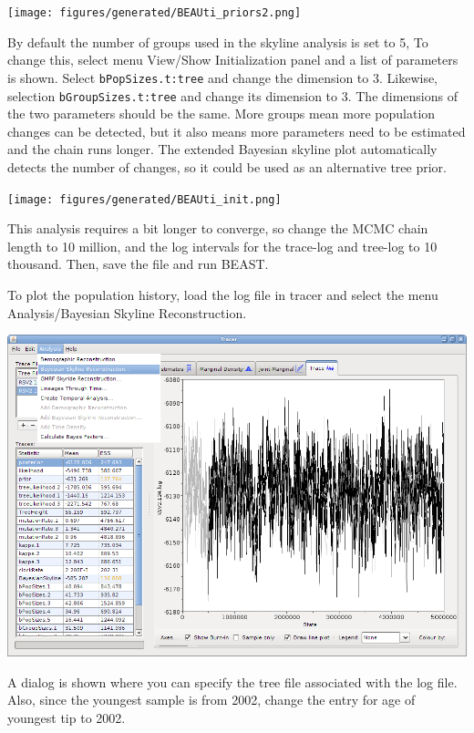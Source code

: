 \documentclass[12pt]{article}
\begin{document}
\begin{center}
\texttt{[image: figures/generated/BEAUti\_priors2.png]}
\end{center}

By default the number of groups used in the skyline analysis is set to 5, To change this,
select menu View/Show Initialization panel and a list of parameters is shown. Select
{\tt bPopSizes.t:tree} and change the dimension to 3. Likewise, selection {\tt bGroupSizes.t:tree}
and change its dimension to 3. The dimensions of the two parameters should be the same.
More groups mean more population changes can be detected, but it also means more parameters
need to be estimated and the chain runs longer. The extended Bayesian skyline plot
automatically detects the number of changes, so it could be used as an alternative
tree prior.

\begin{center}
\texttt{[image: figures/generated/BEAUti\_init.png]}
\end{center}


This analysis requires a bit longer to converge, so change the MCMC chain length to 10 million,
and the log intervals for the trace-log and tree-log to 10 thousand. 
Then, save the file and run BEAST.


To plot the population history, load the log file in tracer and select the menu 
Analysis/Bayesian Skyline Reconstruction.

\includegraphics[scale=0.5,clip=true,trim=0 300 0 0]{figures/tracerBSP1.png}

A dialog is shown where you can specify the tree file associated with the log file.
Also, since the youngest sample is from 2002, change the entry for age of youngest
tip to 2002.
\end{document}

